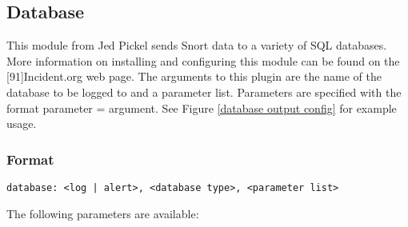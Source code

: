 \documentclass[english]{report}
\begin{document}
\subsection{Database}

This module from Jed Pickel sends Snort data to a variety of SQL databases.
More information on installing and configuring this module can be
found on the {[}91{]}Incident.org web page. The arguments to this
plugin are the name of the database to be logged to and a parameter
list. Parameters are specified with the format parameter = argument.
See Figure \ref{database output config} for example usage.


\subsubsection{Format}

\begin{verbatim}
database: <log | alert>, <database type>, <parameter list>
\end{verbatim}
The following parameters are available:
\end{document}
